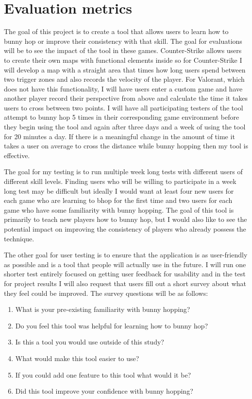 \documentclass[10pt,twocolumn]{article}
\begin{document}
\section{Evaluation metrics}

The goal of this project is to create a tool that allows users to learn how to bunny hop or improve their consistency with that skill. The goal for evaluations will be to see the impact of the tool in these games. Counter-Strike allows users to create their own maps with functional elements inside so for Counter-Strike I will develop a map with a straight area that times how long users spend between two trigger zones and also records the velocity of the player. For Valorant, which does not have this functionality, I will have users enter a custom game and have another player record their perspective from above and calculate the time it takes users to cross between two points. I will have all participating testers of the tool attempt to bunny hop 5 times in their corresponding game environment before they begin using the tool and again after three days and a week of using the tool for 20 minutes a day. If there is a meaningful change in the amount of time it takes a user on average to cross the distance while bunny hopping then my tool is effective. 

The goal for my testing is to run multiple week long tests with different users of different skill levels. Finding users who will be willing to participate in a week long test may be difficult but ideally I would want at least four new users for each game who are learning to bhop for the first time and two users for each game who have some familiarity with bunny hopping. The goal of this tool is primarily to teach new players how to bunny hop, but I would also like to see the potential impact on improving the consistency of players who already possess the technique.

The other goal for user testing is to ensure that the application is as user-friendly as possible and is a tool that people will actually use in the future. I will run one shorter test entirely focused on getting user feedback for usability and in the test for project results I will also request that users fill out a short survey about what they feel could be improved. The survey questions will be as follows:
\begin{enumerate}
    \item What is your pre-existing familiarity with bunny hopping?
    \item Do you feel this tool was helpful for learning how to bunny hop?
    \item Is this a tool you would use outside of this study?
    \item What would make this tool easier to use?
    \item If you could add one feature to this tool what would it be?
    \item Did this tool improve your confidence with bunny hopping?
    
\end{enumerate}
\end{document}
